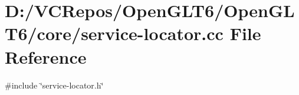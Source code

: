\hypertarget{service-locator_8cc}{}\section{D\+:/\+V\+C\+Repos/\+Open\+G\+L\+T6/\+Open\+G\+L\+T6/core/service-\/locator.cc File Reference}
\label{service-locator_8cc}
{\ttfamily \#include \char`\"{}service-\/locator.\+h\char`\"{}}\newline
